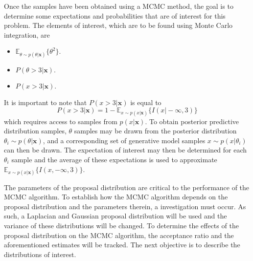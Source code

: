 \documentclass{article}
\begin{document}
	Once the samples have been obtained using a MCMC method, the goal is to determine some expectations and probabilities that are of interest for this problem. The elements of interest, which are to be found using Monte Carlo integration, are
	\begin{itemize}
		\item $\mathbb{E}_{\theta \sim p(\theta \vert \mathbf{x})} \{ \theta^2 \}$.
		\item $P(\theta > 3 \vert \mathbf{x})$.
		\item $P(x > 3 \vert \mathbf{x})$.
	\end{itemize}

	It is important to note that $P(x > 3 \vert \mathbf{x})$ is equal to  
	\begin{equation}
		P(x > 3 \vert \mathbf{x})= 1 - \mathbb{E}_{x \sim p(x \vert \mathbf{x})} \{ I(x \vert -\infty, 3) \}
	\end{equation} 
	which requires access to samples from $p(x \vert \mathbf{x})$. To obtain posterior predictive distribution samples, $\theta$ samples may be drawn from the posterior distribution $\theta_i \sim p(\theta \vert \mathbf{x})$, and a corresponding set of generative model samples $x \sim p(x \vert \theta_i)$ can then be drawn. The expectation of interest may then be determined for each $\theta_i$ sample and the average of these expectations is used to approximate $\mathbb{E}_{x \sim p(x \vert \mathbf{x})} \{ I(x, -\infty, 3) \}$. 
	
	The parameters of the proposal distribution are critical to the performance of the MCMC algorithm. To establish how the MCMC algorithm depends on the proposal distribution and the parameters therein, a investigation must occur. As such, a Laplacian and Gaussian proposal distribution will be used and the variance of these distributions will be changed. To determine the effects of the proposal distribution on the MCMC algorithm, the acceptance ratio and the aforementioned estimates will be tracked. The next objective is to describe the distributions of interest.
	
\end{document}
